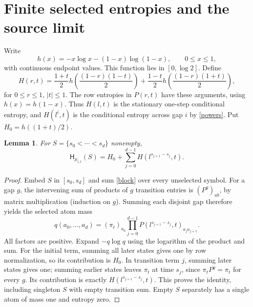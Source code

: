 \documentclass[11pt]{article}
\newtheorem{lemma}[theorem]{Lemma}
\newcommand{\HH}{\mathsf H}
\begin{document}
\section{Finite selected entropies and the source limit}
Write
\[
 h(x)=-x\log x-(1-x)\log(1-x),\qquad 0\leq x\leq1,
\]
with continuous endpoint values. This function lies in $[0,\log2]$. Define
\begin{equation}
 H(r,t)=\frac{1+t}{2}h\left(\frac{(1-r)(1-t)}2\right)
       +\frac{1-t}{2}h\left(\frac{(1-r)(1+t)}2\right),\label{H}
\end{equation}
for $0\leq r\leq1$, $|t|\leq1$. The row entropies in $P(r,t)$ have these arguments, using $h(x)=h(1-x)$. Thus $H(l,t)$ is the stationary one-step conditional entropy, and $H(l^i,t)$ is the conditional entropy across gap $i$ by \eqref{powers}. Put $H_0=h((1+t)/2)$.

\begin{lemma}\label{selected}
For $S=\{s_0<\cdots<s_d\}$ nonempty,
\[
 \HH_{\mu_{l,t}}(S)=H_0+\sum_{j=0}^{d-1}H(l^{s_{j+1}-s_j},t).
\]
\end{lemma}
\begin{proof}
Embed $S$ in $[s_0,s_d]$ and sum \eqref{block} over every unselected symbol. For a gap $g$, the intervening sum of products of $g$ transition entries is $(P^g)_{ab}$, by matrix multiplication (induction on $g$). Summing each disjoint gap therefore yields the selected atom mass
\[
 q(a_0,\ldots,a_d)=(\pi_t)_{a_0}\prod_{j=0}^{d-1}
 P(l^{s_{j+1}-s_j},t)_{a_j a_{j+1}}.
\]
All factors are positive. Expand $-q\log q$ using the logarithm of the product and sum. For the initial term, summing all later states gives one by row normalization, so its contribution is $H_0$. In transition term $j$, summing later states gives one; summing earlier states leaves $\pi_t$ at time $s_j$, since $\pi_tP^g=\pi_t$ for every $g$. Its contribution is exactly $H(l^{s_{j+1}-s_j},t)$. This proves the identity, including singleton $S$ with empty transition sum. Empty $S$ separately has a single atom of mass one and entropy zero.
\end{proof}
\end{document}
